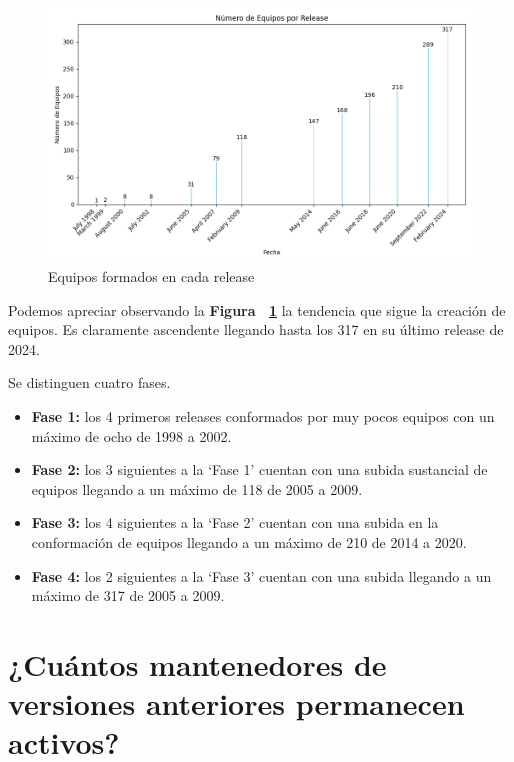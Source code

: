 \documentclass[a4paper, 12pt]{book}
\begin{document}
\begin{figure}
	\centering
	\includegraphics[width=15cm, keepaspectratio]{img/Figura3_buena_equipos.png}
	\caption{Equipos formados en cada release}
	\label{fig:equipos}
\end{figure}

Podemos apreciar observando la \textbf{Figura ~\ref{fig:equipos}} la tendencia que sigue la creación de equipos. Es claramente ascendente llegando hasta los 317 en su último release de 2024.

Se distinguen cuatro fases.
\begin{itemize}
	\item  \textbf{Fase 1:} los 4 primeros releases conformados por muy pocos equipos con un máximo de ocho de 1998 a 2002. 
	
	\item  \textbf{Fase 2:} los 3 siguientes a la `Fase 1' cuentan con una subida sustancial de equipos llegando a un máximo de 118 de 2005 a 2009.
	
	\item  \textbf{Fase 3:} los 4 siguientes a la `Fase 2' cuentan con una subida en la conformación de equipos llegando a un máximo de 210 de 2014 a 2020.
	
	\item  \textbf{Fase 4:} los 2 siguientes a la `Fase 3' cuentan con una subida  llegando a un máximo de 317 de 2005 a 2009.
	
\end{itemize}

\section{¿Cuántos mantenedores de versiones anteriores permanecen activos?}
\label{sec:pregunta_3}
\end{document}
